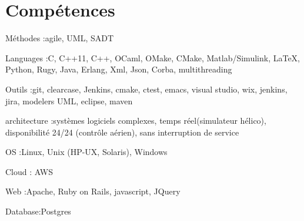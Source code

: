 \section{Compétences}

\begin{itemize}

\myitem
{Méthodes :}{agile, UML, SADT}

\myitem
{Languages :}{C, C++11, C++, OCaml, OMake, CMake, Matlab/Simulink, LaTeX, Python, Rugy, Java, Erlang, Xml, Json, Corba, multithreading}

\myitem
{Outils :}{git, clearcase, Jenkins, cmake, ctest, emacs, visual studio, wix, jenkins, jira, modelers UML, eclipse, maven}

\myitem
{architecture :}{systèmes logiciels complexes, temps réel(simulateur hélico), disponibilité 24/24 (contrôle aérien), sans interruption de service}

\myitem
{OS :}{Linux, Unix (HP-UX, Solaris), Windows}

\myitem
{Cloud} : {AWS}

\myitem 
{Web :}{Apache, Ruby on Rails, javascript, JQuery}

\myitem 
{Database:}{Postgres}

\end{itemize}
